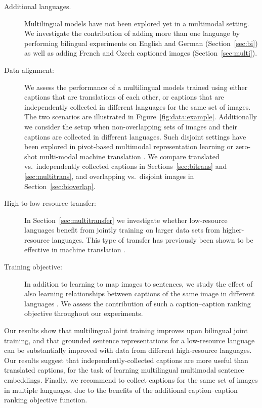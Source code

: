 \begin{description}
\item[Additional languages.]
Multilingual models have not been explored yet in a multimodal setting. We investigate the contribution of adding more than one language by performing bilingual experiments on English and German (Section~\ref{sec:bi}) as well as adding French and Czech captioned images (Section~\ref{sec:multi}).

\item[Data alignment:] We assess the performance of a multilingual models trained using either captions that are translations of each other, or captions that are independently collected in different languages for the same set of images. The two scenarios are illustrated in Figure~\ref{fig:data:example}. Additionally we consider the setup when non-overlapping sets of images and their captions are collected in different languages. Such disjoint settings have been explored in pivot-based multimodal representation learning \cite{funaki2015image,rajendran2015bridge} or zero-shot multi-modal machine translation \cite{nakayama2017zero}.
We compare translated vs.\ independently collected captions in Sections~\ref{sec:bitrans} and \ref{sec:multitrans}, and overlapping vs.\ disjoint images in Section~\ref{sec:bioverlap}.

\item[High-to-low resource transfer:] In Section~\ref{sec:multitransfer} we investigate whether low-resource languages benefit from jointly training on larger data sets from higher-resource languages. This type of transfer has previously been shown to be effective in machine translation \cite[e.g.,][]{zoph2016transfer}.

\item[Training objective:] In addition to learning to map images to sentences, we study the effect of also learning relationships between captions of the same image in different languages \citet{gella2017image}. We assess the contribution of such a caption--caption ranking objective throughout our experiments.
\end{description}
%
Our results show that multilingual joint training improves upon bilingual joint training, and that grounded sentence representations for a low-resource language can be substantially improved with data from different high-resource languages. Our results suggest that independently-collected captions are more useful than translated captions, for the task of learning multilingual multimodal sentence embeddings. Finally, we recommend to collect captions for the same set of images in multiple languages, due to the benefits of the additional caption--caption ranking objective function.

